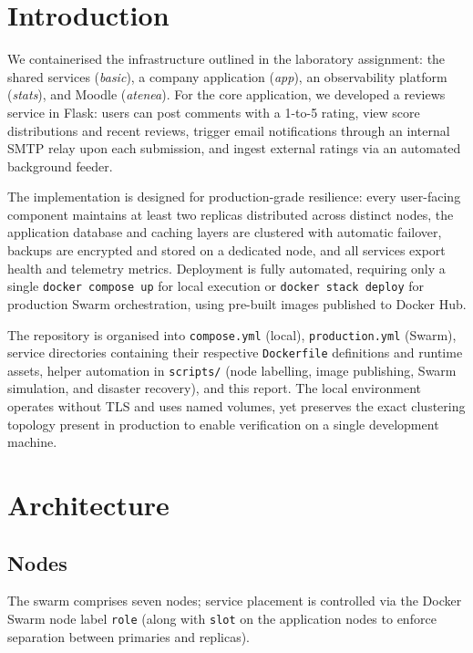\documentclass[11pt,a4paper]{article}
\begin{document}
\section{Introduction}

We containerised the infrastructure outlined in the laboratory assignment: the shared services
(\emph{basic}), a company application (\emph{app}), an observability platform
(\emph{stats}), and Moodle (\emph{atenea}). For the core application, we developed a reviews
service in Flask: users can post comments with a 1-to-5 rating, view score distributions and
recent reviews, trigger email notifications through an internal SMTP relay upon each submission,
and ingest external ratings via an automated background feeder.

The implementation is designed for production-grade resilience: every user-facing component
maintains at least two replicas distributed across distinct nodes, the application database
and caching layers are clustered with automatic failover, backups are encrypted and stored on
a dedicated node, and all services export health and telemetry metrics. Deployment is
fully automated, requiring only a single \texttt{docker compose up} for local execution or
\texttt{docker stack deploy} for production Swarm orchestration, using pre-built images published
to Docker Hub.

The repository is organised into \texttt{compose.yml} (local), \texttt{production.yml} (Swarm),
service directories containing their respective \texttt{Dockerfile} definitions and runtime
assets, helper automation in \texttt{scripts/} (node labelling, image publishing, Swarm simulation,
and disaster recovery), and this report. The local environment operates without TLS and uses
named volumes, yet preserves the exact clustering topology present in production to enable verification on a single development machine.

\section{Architecture}

\subsection{Nodes}

The swarm comprises seven nodes; service placement is controlled via the Docker Swarm node label \texttt{role}
(along with \texttt{slot} on the application nodes to enforce separation between primaries and replicas).
\end{document}
